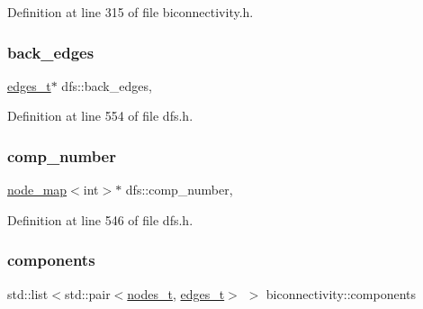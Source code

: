 Definition at line 315 of file biconnectivity.\+h.

\mbox{\label{classdfs_a1dc18a7df8d6b238d5301c92fc7540fa}} 
\subsubsection{\texorpdfstring{back\+\_\+edges}{back\_edges}}
{\footnotesize\ttfamily \mbox{\hyperlink{edge_8h_a8f9587479bda6cf612c103494b3858e3}{edges\+\_\+t}}$\ast$ dfs\+::back\+\_\+edges\hspace{0.3cm}{\ttfamily [protected]}, {\ttfamily [inherited]}}



Definition at line 554 of file dfs.\+h.

\mbox{\label{classdfs_a00db016ac7eab69045cae408008890c1}} 
\subsubsection{\texorpdfstring{comp\+\_\+number}{comp\_number}}
{\footnotesize\ttfamily \mbox{\hyperlink{classnode__map}{node\+\_\+map}}$<$int$>$$\ast$ dfs\+::comp\+\_\+number\hspace{0.3cm}{\ttfamily [protected]}, {\ttfamily [inherited]}}



Definition at line 546 of file dfs.\+h.

\mbox{\label{classbiconnectivity_a5ac244b6442c1ce5b74b5d9c445f8b48}} 
\subsubsection{\texorpdfstring{components}{components}}
{\footnotesize\ttfamily std\+::list$<$std\+::pair$<$\mbox{\hyperlink{edge_8h_a22ac17689106ba21a84e7bc54d1199d6}{nodes\+\_\+t}}, \mbox{\hyperlink{edge_8h_a8f9587479bda6cf612c103494b3858e3}{edges\+\_\+t}}$>$ $>$ biconnectivity\+::components\hspace{0.3cm}{\ttfamily [protected]}}




